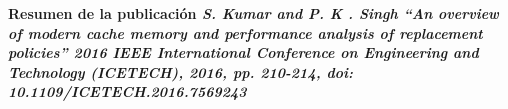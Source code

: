 \item \textbf{Resumen de la publicación \textit{S. Kumar and P. K . Singh ``An overview of modern cache memory and performance analysis of replacement policies'' 2016 IEEE International Conference on Engineering and Technology (ICETECH), 2016, pp. 210-214, doi: 10.1109/ICETECH.2016.7569243}}